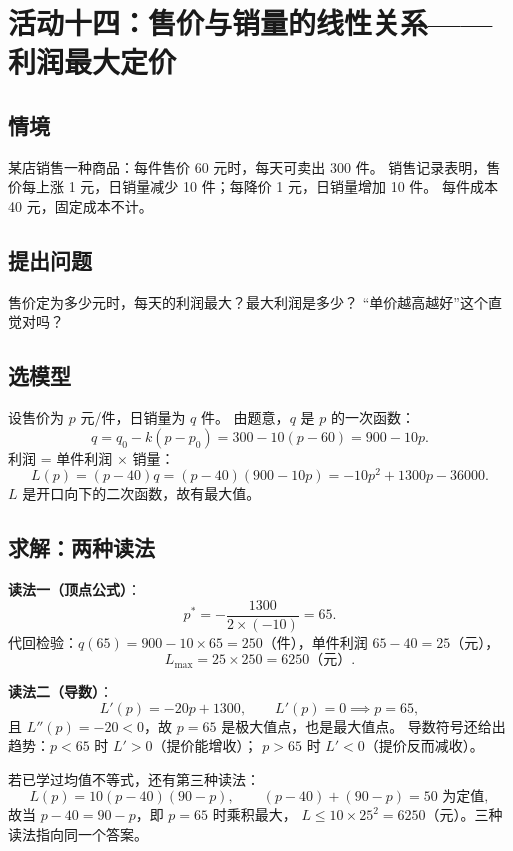 \section{活动十四：售价与销量的线性关系——利润最大定价}

\subsection{情境}
某店销售一种商品：每件售价 60 元时，每天可卖出 300 件。
销售记录表明，售价每上涨 1 元，日销量减少 10 件；每降价 1 元，日销量增加 10 件。
每件成本 40 元，固定成本不计。

\subsection{提出问题}
售价定为多少元时，每天的利润最大？最大利润是多少？
“单价越高越好”这个直觉对吗？

\subsection{选模型}
设售价为 $p$ 元/件，日销量为 $q$ 件。
由题意，$q$ 是 $p$ 的一次函数：
\[
  q=q_0-k(p-p_0)=300-10(p-60)=900-10p.
\]
利润 = 单件利润 $\times$ 销量：
\[
  L(p)=(p-40)q=(p-40)(900-10p)=-10p^2+1300p-36000.
\]
$L$ 是开口向下的二次函数，故有最大值。

\subsection{求解：两种读法}
\textbf{读法一（顶点公式）}：
\[
  p^*=-\frac{1300}{2\times(-10)}=65.
\]
代回检验：$q(65)=900-10\times65=250$（件），单件利润 $65-40=25$（元），
\[
  L_{\max}=25\times250=6250\text{（元）}.
\]

\textbf{读法二（导数）}：
\[
  L'(p)=-20p+1300,\qquad L'(p)=0\implies p=65,
\]
且 $L''(p)=-20<0$，故 $p=65$ 是极大值点，也是最大值点。
导数符号还给出趋势：$p<65$ 时 $L'>0$（提价能增收）；
$p>65$ 时 $L'<0$（提价反而减收）。

若已学过均值不等式，还有第三种读法：
\[
  L(p)=10(p-40)(90-p),\qquad (p-40)+(90-p)=50\text{ 为定值},
\]
故当 $p-40=90-p$，即 $p=65$ 时乘积最大，
$L\le10\times25^2=6250$（元）。三种读法指向同一个答案。

